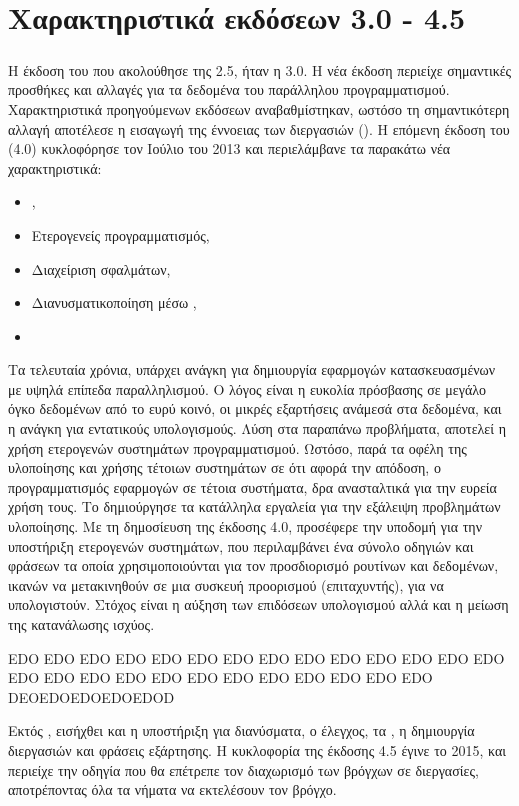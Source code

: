 \section{Χαρακτηριστικά εκδόσεων  3.0 - 4.5}
\subparagraph{}
Η έκδοση του \emph{} που ακολούθησε της 2.5, ήταν η 3.0. Η νέα έκδοση περιείχε σημαντικές προσθήκες και αλλαγές για τα δεδομένα του παράλληλου προγραμματισμού. Χαρακτηριστικά προηγούμενων εκδόσεων αναβαθμίστηκαν, ωστόσο τη σημαντικότερη αλλαγή αποτέλεσε η εισαγωγή της έννοειας των διεργασιών (\emph{}). Η επόμενη έκδοση του \emph{} (4.0) κυκλοφόρησε τον Ιούλιο του 2013 και περιελάμβανε τα παρακάτω νέα χαρακτηριστικά:

\begin{itemize}
    \item \emph{},
    \item Ετερογενείς προγραμματισμός,
    \item Διαχείριση σφαλμάτων,
    \item Διανυσματικοποίηση μέσω \emph{},
    \item \emph{}
\end{itemize}

Τα τελευταία χρόνια, υπάρχει ανάγκη για δημιουργία εφαρμογών κατασκευασμένων με υψηλά επίπεδα παραλληλισμού. Ο λόγος  είναι η ευκολία πρόσβασης σε μεγάλο όγκο δεδομένων από το ευρύ κοινό, οι μικρές εξαρτήσεις ανάμεσά στα δεδομένα, και η ανάγκη για εντατικούς υπολογισμούς. 
Λύση στα παραπάνω προβλήματα, αποτελεί η χρήση ετερογενών συστημάτων προγραμματισμού. 
Ωστόσο, παρά τα οφέλη της υλοποίησης και χρήσης τέτοιων συστημάτων σε ότι αφορά την απόδοση, ο προγραμματισμός εφαρμογών σε τέτοια συστήματα, δρα ανασταλτικά για την ευρεία χρήση τους. 
Το \emph{} δημιούργησε τα κατάλληλα εργαλεία για την εξάλειψη προβλημάτων υλοποίησης. Με τη δημοσίευση της έκδοσης 4.0, προσέφερε την υποδομή για την υποστήριξη ετερογενών συστημάτων, που περιλαμβάνει ένα σύνολο οδηγιών και φράσεων τα οποία χρησιμοποιούνται για τον προσδιορισμό ρουτίνων και δεδομένων, ικανών να μετακινηθούν σε μια συσκευή προορισμού (επιταχυντής), για να υπολογιστούν. Στόχος είναι η αύξηση των επιδόσεων υπολογισμού αλλά και η μείωση της κατανάλωσης ισχύος. 



EDO EDO EDO EDO EDO EDO EDO EDO EDO EDO EDO EDO EDO EDO EDO EDO EDO EDO EDO EDO EDO EDO EDO EDO EDO EDO DEOEDOEDOEDOEDOD

Εκτός , εισήχθει και η \emph{} υποστήριξη για διανύσματα, ο \emph{} έλεγχος, τα \emph{}, η δημιουργία διεργασιών και φράσεις εξάρτησης. 
Η κυκλοφορία της έκδοσης 4.5 έγινε το 2015, και περιείχε την \emph{} οδηγία που θα επέτρεπε τον διαχωρισμό των βρόγχων σε διεργασίες, αποτρέποντας όλα τα νήματα να εκτελέσουν τον βρόγχο.

